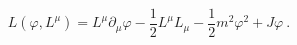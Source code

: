 \begin{equation}
L(\varphi ,L^{\mu })=L^{\mu }\partial _{\mu }\varphi -\frac{1}{2}L^{\mu
}L_{\mu }-\frac{1}{2}m^{2}\varphi ^{2}+J\varphi \ .  \label{llf}
\end{equation}%
